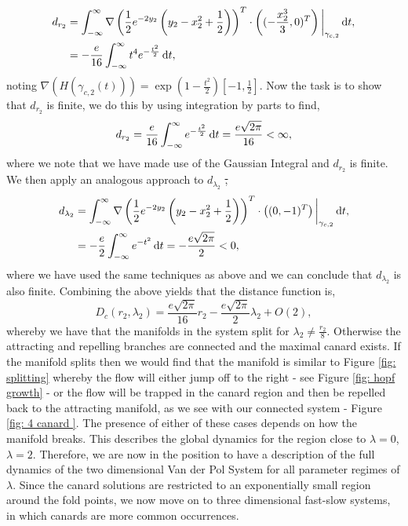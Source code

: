 \begin{align*}
d_{r_2}&=\int_{-\infty}^{\infty} \nabla\left(\frac{1}{2}e^{-2y_2}\left(y_2-x^2_2+\frac{1}{2}\right)\right)^T\cdot\left((-\frac{x_2^3}{3},0)^T\right)\bigg|_{\gamma_{c,2}} \mathop{}\!\mathrm{d} t,\notag\\
&=-\frac{e}{16}\int_{-\infty}^{\infty}t^4e^{-\frac{t^2}{2}}\mathop{}\!\mathrm{d} t,
\end{align*}
noting $ \nabla(H(\gamma_{c,2}(t)))= \exp(1-\frac{t^2}{2})\left[-1,\frac{1}{2}\right]$. Now the task is to show that $ d_{r_2} $ is finite, we do this by using integration by parts to find,
\begin{equation}
d_{r_2}=	\frac{e}{16}\int_{-\infty}^{\infty}e^{-\frac{t^2}{2}}\mathop{}\!\mathrm{d} t=\frac{e\sqrt{2\pi}}{16}<\infty,
\end{equation}
where we note that we have made use of the Gaussian Integral \citep{GausIntegral} and $d_{r_2}$ is finite. We then apply an analogous approach to $d_{\lambda_2} $ \st, 
\begin{align}
d_{\lambda_2}&=\int_{-\infty}^{\infty} \nabla\left(\frac{1}{2}e^{-2y_2}\left(y_2-x^2_2+\frac{1}{2}\right)\right)^T\cdot\left((0,-1)^T\right)\bigg|_{\gamma_{c,2}} \mathop{}\!\mathrm{d} t, \notag\\
&=-\frac{e}{2}\int_{-\infty}^{\infty} e^{-t^2}\mathop{}\!\mathrm{d} t=-\frac{e\sqrt{2\pi}}{2}<0,
\end{align}
where we have used the same techniques as above and we can conclude that $ d_{\lambda_2} $ is also finite. Combining the above yields that the distance function is,
\begin{equation}
D_c(r_2,\lambda_2)=\frac{e\sqrt{2\pi}}{16}r_2-\frac{e\sqrt{2\pi}}{2}\lambda_2+O(2),
\end{equation}  
whereby we have that the manifolds in the \vdp system split for $ \lambda_2\neq\frac{r_2}{8} $. Otherwise the attracting and repelling branches are connected and the maximal canard exists. If the manifold splits then we would find that the manifold is similar to Figure \ref{fig: splitting} whereby the flow will either jump off to the right - see Figure \ref{fig: hopf growth} - or the flow will be trapped in the canard region and then be repelled back to the attracting manifold, as we see with our connected system - Figure \ref{fig: 4 canard }. 
The presence of either of these cases depends on how the manifold breaks.
This describes the global dynamics for the region close to $\lambda =0$, $\lambda=2$.
Therefore, we are now in the position to have a description of the full dynamics of the two dimensional Van der Pol System for all parameter regimes of $\lambda$.
Since the canard solutions are restricted to an exponentially small region around the fold points, we now move on to three dimensional fast-slow systems, in which canards are more common occurrences.




























